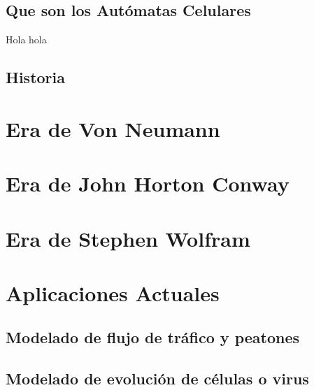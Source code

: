 %


\subsection{Que son los Autómatas Celulares}
Hola \cite{Teoria_von_neumann} hola
\subsection{Historia}



\section{Era de Von Neumann} %


\section{Era de John Horton Conway} %



\section{Era de Stephen Wolfram} %


\section{Aplicaciones Actuales} %

\subsection{Modelado de flujo de tráfico y peatones}

\subsection{Modelado de evolución de células o virus}







